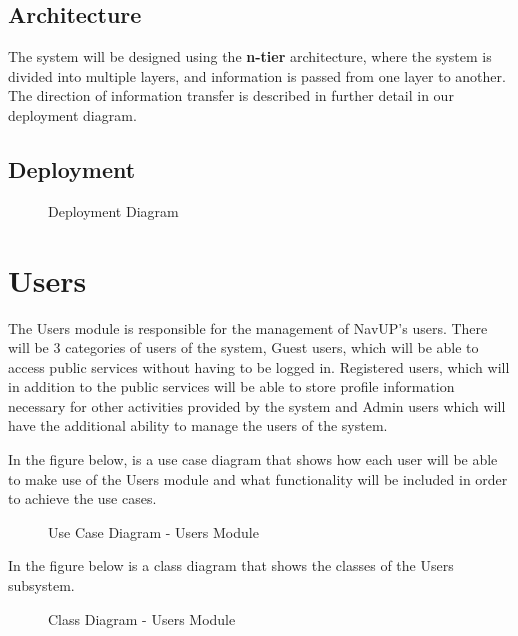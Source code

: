 \documentclass[english]{article}
\begin{document}
        \subsection{Architecture}
        The system will be designed using the \textbf{n-tier} architecture, where the system is divided into multiple layers, and information is passed from one layer to another. The direction of information transfer is described in further detail in our deployment diagram.

       \subsection{Deployment}
            \begin{figure}[H]
            \centering              
            \centerline{}
            \caption{Deployment Diagram}
        \end{figure}

    \newpage
    \section{Users}
        The Users module is responsible for the management of NavUP's users. There will be 3 categories of users of the system, Guest users, which will be able to access public services without having to be logged in. Registered users, which will in addition to the public services will be able to store profile information necessary for other activities provided by the system and Admin users which will have the additional ability to manage the users of the system.
        
        In the figure below, is a use case diagram that shows how each user will be able to make use of the Users module and what functionality will be included in order to achieve the use cases.
        \begin{figure}[H]
            \centering              \centerline{}
            \caption{Use Case Diagram - Users Module}
        \end{figure}
        
        In the figure below is a class diagram that shows the classes of the Users subsystem.
        \begin{figure}[H]
            \centering              \centerline{}
            \caption{Class Diagram - Users Module}
        \end{figure}
        
\end{document}
